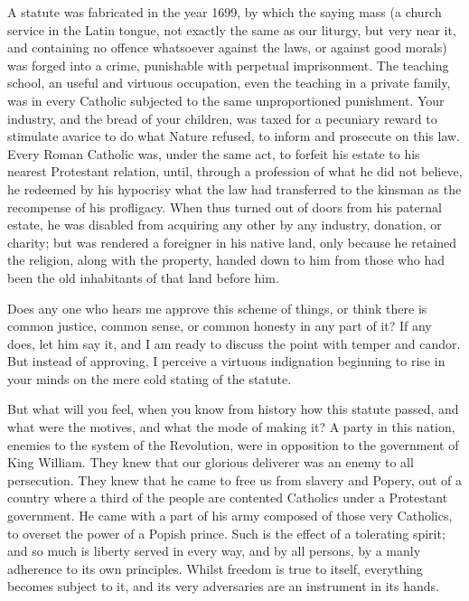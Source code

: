 A statute was fabricated in the year 1699, by which the saying mass (a church service in the Latin tongue, not exactly the same as our liturgy, but very near it, and containing no offence whatsoever against the laws, or against good morals) was forged into a crime, punishable with perpetual imprisonment. The teaching school, an useful and virtuous occupation, even the teaching in a private family, was in every Catholic subjected to the same unproportioned punishment. Your industry, and the bread of your children, was taxed for a pecuniary reward to stimulate avarice to do what Nature refused, to inform and prosecute on this law. Every Roman Catholic was, under the same act, to forfeit his estate to his nearest Protestant relation, until, through a profession of what he did not believe, he redeemed by his hypocrisy what the law had transferred to the kinsman as the recompense of his profligacy. When thus turned out of doors from his paternal estate, he was disabled from acquiring any other by any industry, donation, or charity; but was rendered a foreigner in his native land, only because he retained the religion, along with the property, handed down to him from those who had been the old inhabitants of that land before him.

Does any one who hears me approve this scheme of things, or think there is common justice, common sense, or common honesty in any part of it? If any does, let him say it, and I am ready to discuss the point with temper and candor. But instead of approving, I perceive a virtuous indignation beginning to rise in your minds on the mere cold stating of the statute.

But what will you feel, when you know from history how this statute passed, and what were the motives, and what the mode of making it? A party in this nation, enemies to the system of the Revolution, were in opposition to the government of King William. They knew that our glorious deliverer was an enemy to all persecution. They knew that he came to free us from slavery and Popery, out of a country where a third of the people are contented Catholics under a Protestant government. He came with a part of his army composed of those very Catholics, to overset the power of a Popish prince. Such is the effect of a tolerating spirit; and so much is liberty served in every way, and by all persons, by a manly adherence to its own principles. Whilst freedom is true to itself, everything becomes subject to it, and its very adversaries are an instrument in its hands.

